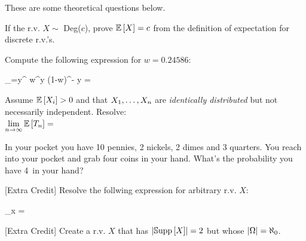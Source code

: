 \documentclass[12pt]{article}
\begin{document}
\eenum

\problem These are some theoretical questions below.

\benum
{} If the r.v. $X \sim $ Deg($c$), prove $\mathbb{E}\left[X\right] = c$ from the definition of expectation for discrete r.v.'s. 




 Compute the following expression for $w = 0.24586$:

\beqn
\sum_{\ell=y}^\infty {} w^y (1-w)^{\ell - y}  = \quad\quad\quad\quad
\eeqn{}

 Assume $\mathbb{E}\left[X_i\right] > 0$ and that $X_1, \ldots, X_n $ are \textit{identically distributed} but not necessarily independent. Resolve: \\

$\displaystyle\lim_{n \rightarrow \infty} \mathbb{E}\left[T_n\right]  = $


 In your pocket you have 10 pennies, 2 nickels, 2 dimes and 3 quarters. You reach into your pocket and grab four coins in your hand. What's the probability you have 4\textcent~in your hand? 


 [Extra Credit] Resolve the follwing expression for arbitrary r.v. $X$:

\beqn
\bigcup_{x \in {}}   = \quad\quad\quad\quad
\eeqn

 [Extra Credit] Create a r.v. $X$ that has $\left|\mathbb{S}\text{upp}\left[X\right]\right| = 2$ but whose $\left|\Omega\right| =  \aleph_0$.

\eenum
\end{document}

